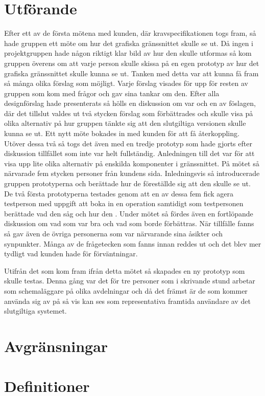 \section{Utförande} 
Efter ett av de första mötena med kunden, där kravspecifikationen togs fram, så hade gruppen ett möte om hur det grafiska gränssnittet skulle se ut. Då ingen i projektgruppen hade någon riktigt klar bild av hur den skulle utformas så kom gruppen överens om att varje person skulle skissa på en egen prototyp av hur det grafiska gränssnittet skulle kunna se ut. Tanken med detta var att kunna få fram så många olika förslag som möjligt. Varje förslag visades för upp för resten av gruppen som kom med frågor och gav sina tankar om den. Efter alla designförslag hade presenterats så hölls en diskussion om var och en av föslagen, där det tillslut valdes ut två stycken förslag som förbättrades och skulle visa på olika alternativ på hur gruppen tänkte sig att den slutgiltiga versionen skulle kunna se ut. Ett nytt möte bokades in med kunden för att få återkoppling. Utöver dessa två så togs det även med en tredje prototyp som hade gjorts efter diskussion tillfället som inte var helt fullständig. Anledningen till det var för att visa upp lite olika alternativ på enskilda komponenter i gränssnittet. På mötet så närvarade fem stycken personer från kundens sida. Inledningsvis så introducerade gruppen prototyperna och berättade hur de föreställde sig att den skulle se ut.  De två första prototyperna testades genom att en av dessa fem fick agera testperson med uppgift att boka in en operation samtidigt som testpersonen berättade vad den såg och hur den . Under mötet så fördes även en fortlöpande diskussion om vad som var bra och vad som borde förbättras. När tillfälle fanns så gav även de övriga personerna som var närvarande sina åsikter och synpunkter. Många av de frågetecken som fanns innan reddes ut och det blev mer tydligt vad kunden hade för förväntningar.  

Utifrån det som kom fram ifrån detta mötet så skapades en ny prototyp som skulle testas. Denna gång var det för tre personer som i skrivande stund arbetar som schemaläggare på olika avdelningar och då det främst är de som kommer använda sig av  på så vis kan ses som representativa framtida användare av det slutgiltiga systemet.    


\section{Avgränsningar}


\section{Definitioner}
  

